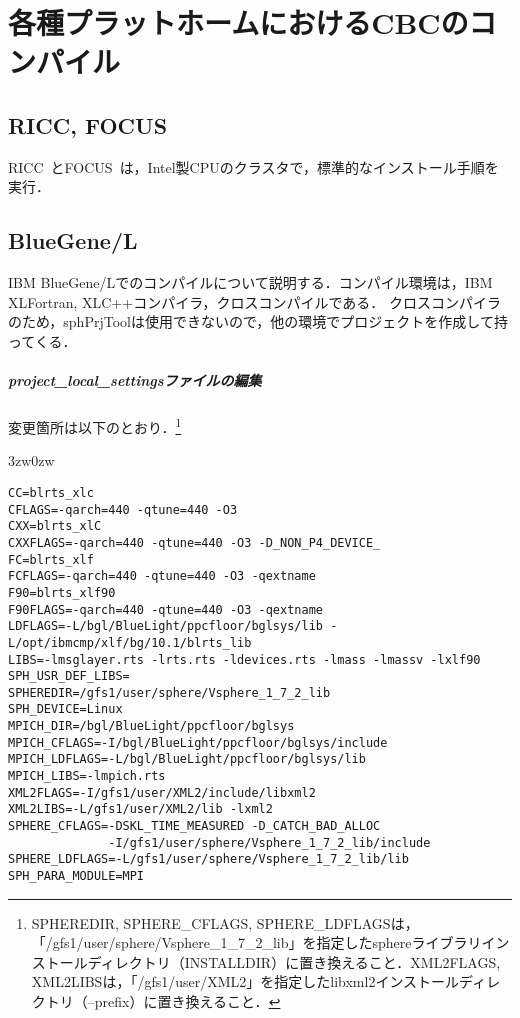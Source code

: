 %
\section{各種プラットホームにおけるCBCのコンパイル}

%
\subsection{RICC, FOCUS}
RICC~\cite{RICC}とFOCUS~\cite{FOCUS}は，Intel製CPUのクラスタで，標準的なインストール手順を実行．

%
\subsection{BlueGene/L}
IBM BlueGene/Lでのコンパイルについて説明する．コンパイル環境は，IBM XLFortran, XLC++コンパイラ，クロスコンパイルである．
クロスコンパイラのため，sphPrjToolは使用できないので，他の環境でプロジェクトを作成して持ってくる．
\vspace{\baselineskip}

\subparagraph{project\_local\_settingsファイルの編集}
変更箇所は以下のとおり．\footnote{SPHEREDIR, SPHERE\_CFLAGS, SPHERE\_LDFLAGSは，「/gfs1/user/sphere/Vsphere\_1\_7\_2\_lib」を指定したsphereライブラリインストールディレクトリ（INSTALLDIR）に置き換えること．XML2FLAGS, XML2LIBSは，「/gfs1/user/XML2」を指定したlibxml2インストールディレクトリ（--prefix）に置き換えること．}

\begin{indentation}{3zw}{0zw}
\small
\begin{verbatim}
CC=blrts_xlc
CFLAGS=-qarch=440 -qtune=440 -O3
CXX=blrts_xlC
CXXFLAGS=-qarch=440 -qtune=440 -O3 -D_NON_P4_DEVICE_ 
FC=blrts_xlf
FCFLAGS=-qarch=440 -qtune=440 -O3 -qextname
F90=blrts_xlf90
F90FLAGS=-qarch=440 -qtune=440 -O3 -qextname
LDFLAGS=-L/bgl/BlueLight/ppcfloor/bglsys/lib -L/opt/ibmcmp/xlf/bg/10.1/blrts_lib
LIBS=-lmsglayer.rts -lrts.rts -ldevices.rts -lmass -lmassv -lxlf90
SPH_USR_DEF_LIBS=
SPHEREDIR=/gfs1/user/sphere/Vsphere_1_7_2_lib
SPH_DEVICE=Linux
MPICH_DIR=/bgl/BlueLight/ppcfloor/bglsys
MPICH_CFLAGS=-I/bgl/BlueLight/ppcfloor/bglsys/include
MPICH_LDFLAGS=-L/bgl/BlueLight/ppcfloor/bglsys/lib
MPICH_LIBS=-lmpich.rts
XML2FLAGS=-I/gfs1/user/XML2/include/libxml2
XML2LIBS=-L/gfs1/user/XML2/lib -lxml2
SPHERE_CFLAGS=-DSKL_TIME_MEASURED -D_CATCH_BAD_ALLOC 
              -I/gfs1/user/sphere/Vsphere_1_7_2_lib/include
SPHERE_LDFLAGS=-L/gfs1/user/sphere/Vsphere_1_7_2_lib/lib
SPH_PARA_MODULE=MPI
\end{verbatim}
\end{indentation}


